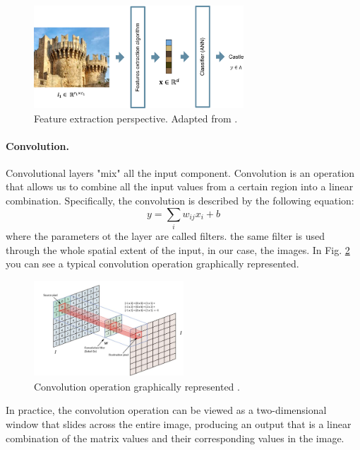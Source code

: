 \begin{figure}
    \centering
    \includegraphics[width=0.7\textwidth]{Images/featureextraction.png}
    \caption[Feature extraction perspective.]{Feature extraction perspective. Adapted from \cite{giacomo_boracchi_convolutional_2021}.}
    \label{fig:cazzle}
\end{figure}

\paragraph{Convolution.} Convolutional layers "mix" all the input component. Convolution is an operation that allows us to combine all the input values from a certain region into a linear combination. Specifically, the convolution is described by the following equation:
\begin{equation}
    \label{eq:convolution}
    y=\sum_iw_{ij}x_i+b
\end{equation}
where the parameters ot the layer are called filters. the same filter is used through the whole spatial extent of the input, in our case, the images. In Fig. \ref{fig:convmatrice} you can see a typical convolution operation graphically represented.
\begin{figure}
    \centering
    \includegraphics[width=0.5\textwidth]{Images/convolution.png}
    \caption[Convolution operation]{Convolution operation graphically represented \cite{giacomo_boracchi_convolutional_2021}.}
    \label{fig:convmatrice}
\end{figure}
In practice, the convolution operation can be viewed as a two-dimensional window that slides across the entire image, producing an output that is a linear combination of the matrix values and their corresponding values in the image.
